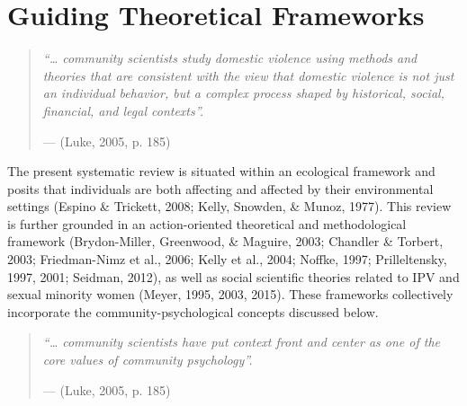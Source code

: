 \documentclass[11pt,]{tufte-book}
\begin{document}
\section{Guiding Theoretical
Frameworks}\label{guiding-theoretical-frameworks}

\begin{quote}
\emph{``\ldots{} community scientists study domestic violence using
methods and theories that are consistent with the view that domestic
violence is not just an individual behavior, but a complex process
shaped by historical, social, financial, and legal contexts''.}

\hfill --- (Luke, 2005, p. 185)
\end{quote}

The present systematic review is situated within an ecological framework
and posits that individuals are both affecting and affected by their
environmental settings (Espino \& Trickett, 2008; Kelly, Snowden, \&
Munoz, 1977). This review is further grounded in an action-oriented
theoretical and methodological framework (Brydon-Miller, Greenwood, \&
Maguire, 2003; Chandler \& Torbert, 2003; Friedman-Nimz et al., 2006;
Kelly et al., 2004; Noffke, 1997; Prilleltensky, 1997, 2001; Seidman,
2012), as well as social scientific theories related to IPV and sexual
minority women (Meyer, 1995, 2003, 2015). These frameworks collectively
incorporate the community-psychological concepts discussed below.


\begin{quote}
\emph{``\ldots{} community scientists have put context front and center
as one of the core values of community psychology''.}

\hfill --- (Luke, 2005, p. 185)
\end{quote}
\end{document}
